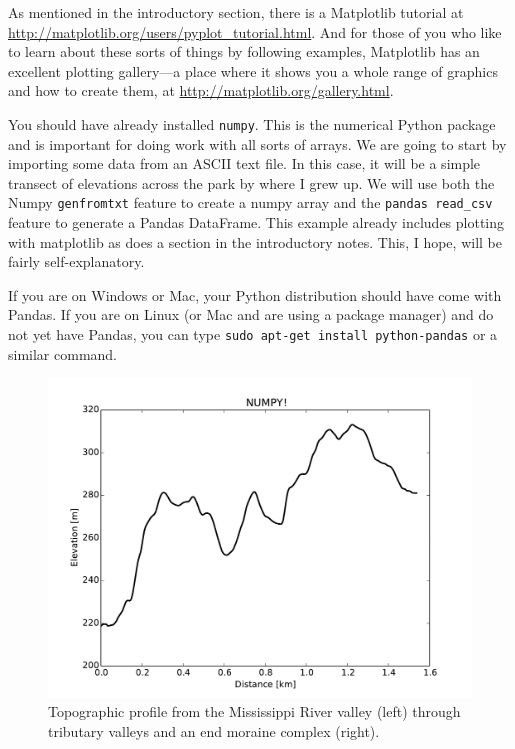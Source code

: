 \documentclass[a4paper,10pt]{scrartcl}
\begin{document}
\begin{framed}
As mentioned in the introductory section, there is a Matplotlib tutorial at \url{http://matplotlib.org/users/pyplot_tutorial.html}. And for those of you who like to learn about these sorts of things by following examples, Matplotlib has an excellent plotting gallery---a place where it shows you a whole range of graphics and how to create them, at \url{http://matplotlib.org/gallery.html}.
\end{framed}

You should have already installed \lstinline{numpy}. This is the numerical Python package and is important for doing work with all sorts of arrays. We are going to start by importing some data from an ASCII text file. In this case, it will be a simple transect of elevations across the park by where I grew up. We will use both the Numpy \lstinline{genfromtxt} feature to create a numpy array and the \lstinline{pandas read_csv} feature to generate a Pandas DataFrame. This example already includes plotting with matplotlib as does a section in the introductory notes. This, I hope, will be fairly self-explanatory.

If you are on Windows or Mac, your Python distribution should have come with Pandas. If you are on Linux (or Mac and are using a package manager) and do not yet have Pandas, you can type \lstinline{sudo apt-get install python-pandas} or a similar command.



\begin{figure}[!ht]
\begin{center}
\includegraphics[width=.9\linewidth]{figures/FilesData/BattleCreekProfile.pdf}
\end{center}
\caption{Topographic profile from the Mississippi River valley (left) through tributary valleys and an end moraine complex (right).}
\end{figure}
\end{document}
